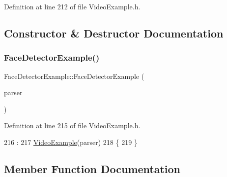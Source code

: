 Definition at line 212 of file Video\+Example.\+h.



\subsection{Constructor \& Destructor Documentation}
\mbox{\label{class_face_detector_example_a3e651a54779ec22dbb9c619c0ce65550}} 
\subsubsection{\texorpdfstring{Face\+Detector\+Example()}{FaceDetectorExample()}}
{\footnotesize\ttfamily Face\+Detector\+Example\+::\+Face\+Detector\+Example (\begin{DoxyParamCaption}\item[{const cv\+::\+Command\+Line\+Parser \&}]{parser }\end{DoxyParamCaption})\hspace{0.3cm}{\ttfamily [inline]}}



Definition at line 215 of file Video\+Example.\+h.


\begin{DoxyCode}
216         :
217           \mbox{\hyperlink{class_video_example_aedc40ab44835e8ad1cf731b7709cd4ac}{VideoExample}}(parser)
218     \{
219     \}
\end{DoxyCode}


\subsection{Member Function Documentation}
\mbox{\label{class_video_example_ace8617201da40b6e230bd6c049b48aa0}} 

